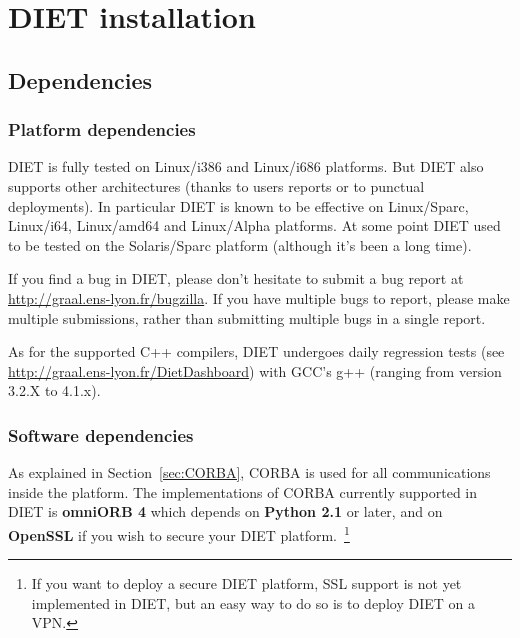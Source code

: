 \chapter{DIET installation}
\label{ch:installing}

\section{Dependencies}
\label{sec:dependencies}

\subsection{Platform dependencies}

DIET is fully tested on Linux/i386 and Linux/i686 platforms.
But DIET also supports other architectures (thanks to users reports or
to punctual deployments). In particular DIET is known to be effective
on Linux/Sparc, Linux/i64, Linux/amd64 and Linux/Alpha platforms.
At some point DIET used to be tested on the Solaris/Sparc platform (although
it's been a long time).

If you find a bug in DIET, please don't hesitate to submit a bug report at
\url{http://graal.ens-lyon.fr/bugzilla}. If you have multiple bugs
to report, please make multiple submissions, rather than submitting
multiple bugs in a single report.

As for the supported C++ compilers, DIET undergoes daily regression tests
(see \url{http://graal.ens-lyon.fr/DietDashboard}) with GCC's g++ (ranging
from version 3.2.X to 4.1.x).

\subsection{Software dependencies}
\label{sec:software_dependencies}

As explained in Section~\ref{sec:CORBA}, CORBA is used for all
communications inside the platform. The implementations of CORBA
currently supported in DIET is \textbf{omniORB 4} which depends on
\textbf{Python 2.1} or later, and on \textbf{OpenSSL} if you wish
to secure your DIET platform.~\footnote{If you want to deploy a
secure DIET platform, SSL support is not yet implemented  in DIET, but
an easy way to do so is to deploy DIET on a VPN.}

